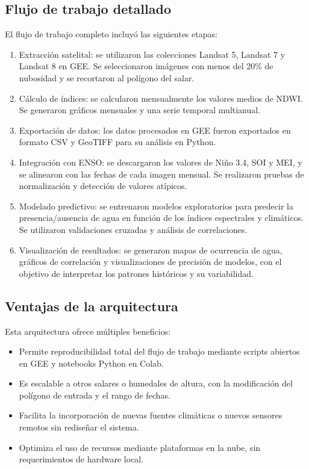 \newpage
\subsection{Flujo de trabajo detallado}

El flujo de trabajo completo incluyó las siguientes etapas:

\begin{enumerate}
    \item Extracción satelital: se utilizaron las colecciones Landsat 5, Landsat 7 y Landsat 8 en GEE. Se seleccionaron imágenes con menos del 20\% de nubosidad y se recortaron al polígono del salar.

    \item Cálculo de índices: se calcularon mensualmente los valores medios de NDWI. Se generaron gráficos mensuales y una serie temporal multianual.

    \item Exportación de datos: los datos procesados en GEE fueron exportados en formato CSV y GeoTIFF para su análisis en Python.

    \item Integración con ENSO: se descargaron los valores de Niño 3.4, SOI y MEI, y se alinearon con las fechas de cada imagen mensual. Se realizaron pruebas de normalización y detección de valores atípicos.

    \item Modelado predictivo: se entrenaron modelos exploratorios para predecir la presencia/ausencia de agua en función de los índices espectrales y climáticos. Se utilizaron validaciones cruzadas y análisis de correlaciones.

    \item Visualización de resultados: se generaron mapas de ocurrencia de agua, gráficos de correlación y visualizaciones de precisión de modelos, con el objetivo de interpretar los patrones históricos y su variabilidad.
\end{enumerate}


\subsection{Ventajas de la arquitectura}

Esta arquitectura ofrece múltiples beneficios:

\begin{itemize}
    \item Permite reproducibilidad total del flujo de trabajo mediante scripts abiertos en GEE y notebooks Python en Colab.
    \item Es escalable a otros salares o humedales de altura, con la modificación del polígono de entrada y el rango de fechas.
    \item Facilita la incorporación de nuevas fuentes climáticas o nuevos sensores remotos sin rediseñar el sistema.
    \item Optimiza el uso de recursos mediante plataformas en la nube, sin requerimientos de hardware local.
\end{itemize}

